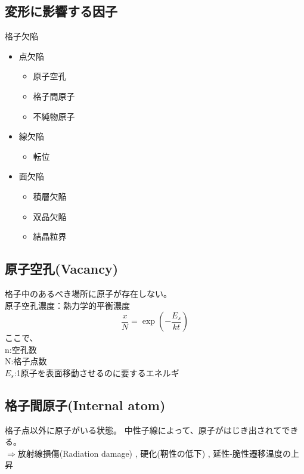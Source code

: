 \documentclass[a4j,twoside,openright,11pt]{jreport}
\begin{document}
\subsection{変形に影響する因子}
格子欠陥\\
\begin{itemize}
\item 点欠陥
\begin{itemize}
\item 原子空孔
\item 格子間原子
\item 不純物原子
\end{itemize}
\item 線欠陥
\begin{itemize}
\item 転位
\end{itemize}
\item 面欠陥
\begin{itemize}
\item 積層欠陥
\item 双晶欠陥
\item 結晶粒界
\end{itemize}
\end{itemize}

\subsection{原子空孔(Vacancy)}
格子中のあるべき場所に原子が存在しない。\\
原子空孔濃度：熱力学的平衡濃度\\
\begin{equation}
\frac{x}{N} = \exp(-\frac{E_s}{kt})
\end{equation}
ここで、\\
n:空孔数\\
N:格子点数\\
$E_s$:1原子を表面移動させるのに要するエネルギ

\subsection{格子間原子(Internal atom)}
格子点以外に原子がいる状態。 中性子線によって、原子がはじき出されてできる。\\
$\Rightarrow$放射線損傷(Radiation damage) , 硬化(靭性の低下) , 延性-脆性遷移温度の上昇\\
\end{document}
